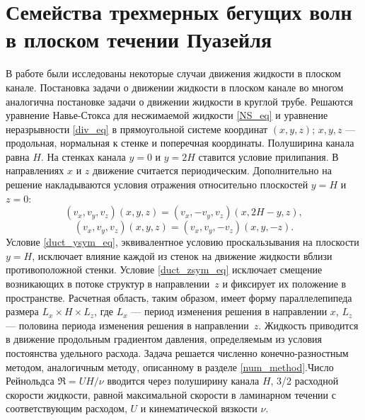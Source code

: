 \begin{comment}
Re2200ub:
lin: cf = 0.44473618074359494, lambda = -0.0085
vwz: cf = 0.6470799307435949, lambda = -0.021

Re1700ub:
lin: cf = 0.633021694959945, lambda = -0.02
vwz: cf = 0.651179838899339, lambda = -0.028 (unsym)
        Осесимметричное возмущение, lambda = -0.028
\end{comment}

\section{Семейства трехмерных бегущих волн в плоском течении Пуазейля}

В работе были исследованы некоторые случаи движения жидкости в плоском канале. Постановка задачи о движении жидкости в плоском канале во многом аналогична постановке задачи о движении жидкости в круглой трубе. Решаются уравнение Навье-Стокса для несжимаемой жидкости \eqref{NS_eq} и уравнение неразрывности \eqref{div_eq} в прямоугольной системе координат $(x,y,z)$; $x, y, z$ --- продольная, нормальная к стенке и поперечная координаты. Полуширина канала равна $H$. На стенках канала $y = 0$ и $y = 2H$ ставится условие прилипания. В направлениях $x$ и $z$ движение считается периодическим. Дополнительно на решение накладываются условия отражения относительно плоскостей $y = H$ и $z = 0$:
\begin{equation} \label{duct_ysym_eq}
(v_x,v_y,v_z)(x,y,z) = (v_x,-v_y,v_z)(x, 2H-y, z),
\end{equation} 
\begin{equation} \label{duct_zsym_eq}
(v_x,v_y,v_z)(x,y,z) = (v_x,v_y,-v_z)(x,y,-z). 
\end{equation} 
Условие \eqref{duct_ysym_eq}, эквивалентное условию проскальзывания на плоскости $y = H$, исключает влияние каждой из стенок на движение жидкости вблизи противоположной стенки. Условие \eqref{duct_zsym_eq} исключает смещение возникающих в потоке структур в направлении~$z$ и фиксирует их положение в пространстве. Расчетная область, таким образом, имеет форму параллелепипеда размера $L_x \times H \times L_z$, где $L_x$ --- период изменения решения в направлении $x$, $L_z$ --- половина периода изменения решения в направлении~$z$. Жидкость приводится в движение продольным градиентом давления, определяемым из условия постоянства удельного расхода. Задача решается численно конечно-разностным методом, аналогичным методу, описанному в разделе \ref{num_method}.Число Рейнольдса $\Re = UH/\nu$ вводится через полуширину канала $H$, 3/2 расходной скорости жидкости, равной максимальной скорости в ламинарном течении с соответствующим расходом, $U$ и кинематической вязкости $\nu$. 

